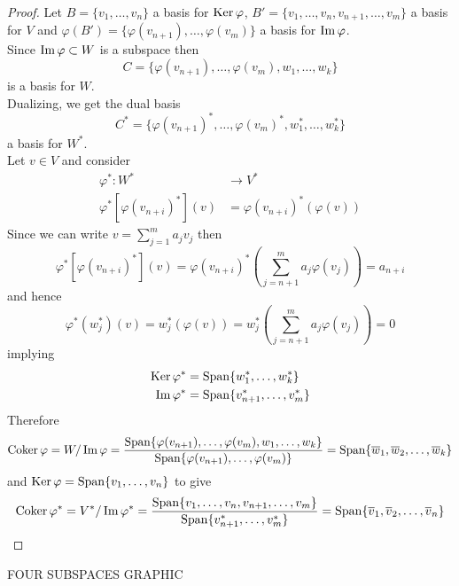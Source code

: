 \documentclass[../Main.tex]{subfiles}
\begin{document}
\begin{proof}
	Let $B=\{v_1,\dots,v_n\}$ a basis for $\operatorname{Ker} \varphi$, $B'=\{v_1,\dots,v_n,v_{n+1},\dots,v_m\}$ a basis for $V$ and $\varphi(B')=\{\varphi(v_{n+1}),\dots,\varphi(v_m)\}$ a basis for $\operatorname{Im} \varphi$.\\
	Since $\operatorname{Im}\varphi \subset W$ is a subspace then
	\[C=\{\varphi(v_{n+1}),\dots,\varphi(v_m),w_1,\dots,w_k\}\]
	is a basis for $W$.\\
	Dualizing, we get the dual basis 
	\[C^\ast = \{\varphi(v_{n+1})^\ast,\dots,\varphi(v_m)^\ast,w_1^\ast,\dots,w_k^\ast\}\]
	a basis for $W^\ast$.\\
	Let $v\in V$ and consider
	\begin{align*}
	\varphi^\ast\colon W^\ast&\to V^\ast \\
	\varphi^\ast[\varphi(v_{n+i})^\ast](v)&=\varphi(v_{n+i})^\ast(\varphi(v))
	\end{align*}
	Since we can write $v=\sum_{j=1}^m a_jv_j$ then
	\[\varphi^\ast[\varphi(v_{n+i})^\ast](v) = \varphi(v_{n+i})^\ast\left(\sum_{j=n+1}^m a_j\varphi(v_j)\right) =a_{n+i}\]
	and hence
	\[\varphi^\ast(w_j^\ast)(v)=w_j^\ast(\varphi(v))=w_j^\ast\left(\sum_{j=n+1}^ma_j\varphi(v_j)\right)=0\]
	implying
	\begin{align*}
	\operatorname{Ker}\varphi^\ast &= \operatorname{Span}\{w_1^\ast,\dots,w_k^\ast\}\\
	\operatorname{Im}\varphi^\ast &= \operatorname{Span}\{v_{n+1}^\ast,\dots,v_m^\ast\}\\
	\end{align*}
	Therefore
	\begin{align*}
	\operatorname{Coker}\varphi = W/\operatorname{Im}\varphi = \frac{\operatorname{Span}\{\varphi(v_{n+1}),\dots,\varphi(v_m),w_1,\dots,w_k  \}}{\operatorname{Span}\{\varphi(v_{n+1}),\dots,\varphi(v_m) \}  } = \operatorname{Span}\{\overline{w}_1,\overline{w}_2,\dots,\overline{w}_k\}
	\end{align*}
	and $\operatorname{Ker}\varphi = \operatorname{Span} \{v_1,\dots,v_n\}$ to give
		\begin{align*}
	\operatorname{Coker}\varphi^\ast = V^\ast/\operatorname{Im}\varphi^\ast = \frac{\operatorname{Span}\{v_1,\dots,v_n,v_{n+1},\dots,v_m  \}}{\operatorname{Span}\{v_{n+1}^\ast,\dots,v_m^\ast \}  } = \operatorname{Span}\{\overline{v}_1,\overline{v}_2,\dots,\overline{v}_n\}
	\end{align*}
\end{proof}
FOUR SUBSPACES GRAPHIC
\end{document}
